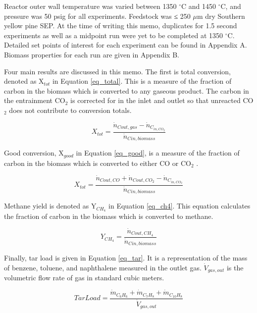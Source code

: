 \documentclass[11pt,twocolumn]{article}
\begin{document}
Reactor outer wall temperature was varied between 1350 $^\circ$C and 1450 $^\circ$C, and pressure was 50 psig for all experiments. Feedstock was ≤ 250 $\mu$m dry Southern yellow pine SEP. At the time
of writing this memo, duplicates for 1.5 second
experiments as well as a midpoint run were yet
to be completed at 1350 $^\circ$C. Detailed set points
of interest for each experiment can be found in
Appendix A. Biomass properties for each run are
given in Appendix B.

Four main results are discussed in this memo.
The first is total conversion, denoted as X$_{tot}$ in
Equation \ref{eq_total}. This is a measure of the fraction of
carbon in the biomass which is converted to any
gaseous product. The carbon in the entrainment
CO$_2$ is corrected for in the inlet and outlet so that
unreacted CO$_2$ does not contribute to conversion
totals.

\begin{equation}
	X_{tot} = \frac{\dot{n}_{C out,gas} - \dot{n}_{C_{in,CO_2}}}{\dot{n}_{C in,biomass}}
	\label{eq_total}
\end{equation}

Good conversion, X$_{good}$ in Equation \ref{eq_good}, is a measure of the fraction of carbon in the biomass which
is converted to either CO or CO$_2$ .

\begin{equation}
	X_{tot} = \frac{\dot{n}_{C out,CO} + \dot{n}_{C out,CO_2}- \dot{n}_{C_{in,CO_2}}}{\dot{n}_{C in,biomass}}
	\label{eq_good}
\end{equation}

Methane yield is denoted as Y$_{CH_4}$ in Equation
\ref{eq_ch4}. This equation calculates the fraction of carbon
in the biomass which is converted to methane.

\begin{equation}
	Y_{CH_4} = \frac{\dot{n}_{C out,CH_4}}{\dot{n}_{C in,biomass}}
	\label{eq_ch4}
\end{equation}

Finally, tar load is given in Equation \ref{eq_tar}. It is a
representation of the mass of benzene, toluene,
and naphthalene measured in the outlet gas.
$\dot{V}_{gas,out}$ is the volumetric flow rate of gas in standard cubic meters.

\begin{equation}
	Tar Load = \frac{\dot{m}_{C_6H_6} + \dot{m}_{C_7H_8}+ \dot{m}_{C_{10}H_8}}{\dot{V}_{gas,out}}
	\label{eq_tar}
\end{equation}
\end{document}

